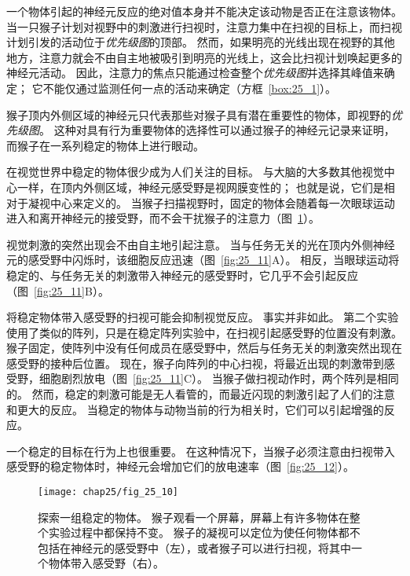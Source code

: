 一个物体引起的神经元反应的绝对值本身并不能决定该动物是否正在注意该物体。
当一只猴子计划对视野中的刺激进行扫视时，注意力集中在扫视的目标上，而扫视计划引发的活动位于\textit{优先级图}的顶部。
然而，如果明亮的光线出现在视野的其他地方，注意力就会不由自主地被吸引到明亮的光线上，这会比扫视计划唤起更多的神经元活动。
因此，注意力的焦点只能通过检查整个\textit{优先级图}并选择其峰值来确定；
它不能仅通过监测任何一点的活动来确定（方框~\ref{box:25_1}）。


\begin{proposition} \label{box:25_1}
	
	\quad \quad 猴子顶内外侧区域的神经元只代表那些对猴子具有潜在重要性的物体，即视野的\textit{优先级图}。
	这种对具有行为重要物体的选择性可以通过猴子的神经元记录来证明，而猴子在一系列稳定的物体上进行眼动。
	
	\quad \quad 在视觉世界中稳定的物体很少成为人们关注的目标。
	与大脑的大多数其他视觉中心一样，在顶内外侧区域，神经元感受野是视网膜变性的；
	也就是说，它们是相对于凝视中心来定义的。
	当猴子扫描视野时，固定的物体会随着每一次眼球运动进入和离开神经元的接受野，而不会干扰猴子的注意力（图~\ref{fig:25_10}）。
	
	\quad \quad 视觉刺激的突然出现会不由自主地引起注意。
	当与任务无关的光在顶内外侧神经元的感受野中闪烁时，该细胞反应迅速（图~\ref{fig:25_11}A）。
	相反，当眼球运动将稳定的、与任务无关的刺激带入神经元的感受野时，它几乎不会引起反应（图~\ref{fig:25_11}B）。
	
	\quad \quad 将稳定物体带入感受野的扫视可能会抑制视觉反应。
	事实并非如此。
	第二个实验使用了类似的阵列，只是在稳定阵列实验中，在扫视引起感受野的位置没有刺激。
	猴子固定，使阵列中没有任何成员在感受野中，然后与任务无关的刺激突然出现在感受野的接种后位置。
	现在，猴子向阵列的中心扫视，将最近出现的刺激带到感受野，细胞剧烈放电（图~\ref{fig:25_11}C）。
	当猴子做扫视动作时，两个阵列是相同的。
	然而，稳定的刺激可能是无人看管的，而最近闪现的刺激引起了人们的注意和更大的反应。
	当稳定的物体与动物当前的行为相关时，它们可以引起增强的反应。
	
	\quad \quad 一个稳定的目标在行为上也很重要。
	在这种情况下，当猴子必须注意由扫视带入感受野的稳定物体时，神经元会增加它们的放电速率（图~\ref{fig:25_12}）。
	
\end{proposition}


\begin{figure}[htbp]
	\centering
	\texttt{[image: chap25/fig\_25\_10]}
	\caption{探索一组稳定的物体。
		猴子观看一个屏幕，屏幕上有许多物体在整个实验过程中都保持不变。
		猴子的凝视可以定位为使任何物体都不包括在神经元的感受野中（左），或者猴子可以进行扫视，将其中一个物体带入感受野（右）。}
	\label{fig:25_10}
\end{figure}


